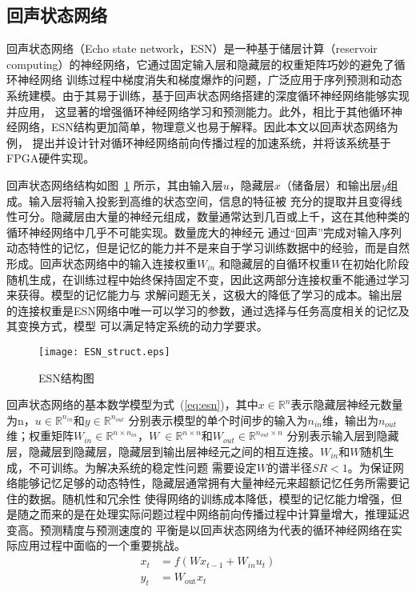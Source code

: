\subsection{回声状态网络}
回声状态网络（Echo state network，ESN）是一种基于储层计算（reservoir computing）的神经网络，它通过固定输入层和隐藏层的权重矩阵巧妙的避免了循环神经网络
训练过程中梯度消失和梯度爆炸的问题，广泛应用于序列预测和动态系统建模。由于其易于训练，基于回声状态网络搭建的深度循环神经网络能够实现并应用，
这显著的增强循环神经网络学习和预测能力。此外，相比于其他循环神经网络，ESN结构更加简单，物理意义也易于解释。因此本文以回声状态网络为例，
提出并设计针对循环神经网络前向传播过程的加速系统，并将该系统基于FPGA硬件实现。

回声状态网络结构如图~\ref{fig:esn} 所示，其由输入层\(u\)，隐藏层\(x\)（储备层）和输出层\(y\)组成。输入层将输入投影到高维的状态空间，信息的特征被
充分的提取并且变得线性可分。隐藏层由大量的神经元组成，数量通常达到几百或上千，这在其他种类的循环神经网络中几乎不可能实现。数量庞大的神经元
通过“回声”完成对输入序列动态特性的记忆，但是记忆的能力并不是来自于学习训练数据中的经验，而是自然形成。回声状态网络中的输入连接权重\(W_{in}\)
和隐藏层的自循环权重\(W\)在初始化阶段随机生成，在训练过程中始终保持固定不变，因此这两部分连接权重不能通过学习来获得。模型的记忆能力与
求解问题无关，这极大的降低了学习的成本。输出层的连接权重是ESN网络中唯一可以学习的参数，通过选择与任务高度相关的记忆及其变换方式，模型
可以满足特定系统的动力学要求。

\begin{figure}
	\centering
	\texttt{[image: ESN\_struct.eps]}
	\caption{ESN结构图}
	\label{fig:esn}
\end{figure}

回声状态网络的基本数学模型为式~(\ref{eq:esn})，其中\(x\in \mathbb{R}^n\)表示隐藏层神经元数量为n，\(u \in \mathbb{R}^{n_{in}}\)和\(y \in \mathbb{R}^{n_{out}}\)
分别表示模型的单个时间步的输入为\(n_{in}\)维，输出为\(n_{out}\)维；权重矩阵\(W_{in} \in \mathbb{R}^{n \times n_{in}}\)，\(W\ \in \mathbb{R}^{n \times n}\)和\(W_{out} \in \mathbb{R}^{n_{out} \times n}\)
分别表示输入层到隐藏层，隐藏层到隐藏层，隐藏层到输出层神经元之间的相互连接。\(W_{in}\)和\(W\)随机生成，不可训练。为解决系统的稳定性问题
需要设定\(W\)的谱半径\(SR < 1\)。为保证网络能够记忆足够的动态特性，隐藏层通常拥有大量神经元来超额记忆任务所需要记住的数据。随机性和冗余性
使得网络的训练成本降低，模型的记忆能力增强，但是随之而来的是在处理实际问题过程中网络前向传播过程中计算量增大，推理延迟变高。预测精度与预测速度的
平衡是以回声状态网络为代表的循环神经网络在实际应用过程中面临的一个重要挑战。
\begin{equation}\label{eq:esn}
	\begin{split}
		x_{t} &= f(W x_{t-1} + W_{in} u_{t})	\\
		y_{t} &= W_{\mathrm{out}} x_{t}				
	\end{split}
\end{equation}

